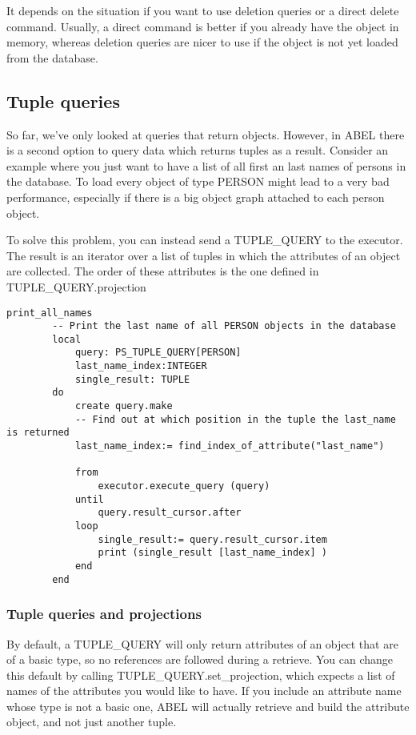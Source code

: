 It depends on the situation if you want to use deletion queries or a direct delete command. 
Usually, a direct command is better if you already have the object in memory, whereas deletion queries are nicer to use if the object is not yet loaded from the database.

\subsection{Tuple queries}

So far, we've only looked at queries that return objects. However, in ABEL there is a second option to query data which returns tuples as a result.
Consider an example where you just want to have a list of all first an last names of persons in the database. 
To load every object of type PERSON might lead to a very bad performance, especially if there is a big object graph attached to each person object.

To solve this problem, you can instead send a TUPLE\_QUERY to the executor. 
The result is an iterator over a list of tuples in which the attributes of an object are collected. The order of these attributes is the one defined in TUPLE\_QUERY.projection

\begin{lstlisting}[language=OOSC2Eiffel, captionpos=b, caption={}, label={lst:tuple_query_simple}]
	print_all_names
		-- Print the last name of all PERSON objects in the database
		local
			query: PS_TUPLE_QUERY[PERSON]
			last_name_index:INTEGER
			single_result: TUPLE
		do
			create query.make
			-- Find out at which position in the tuple the last_name is returned
			last_name_index:= find_index_of_attribute("last_name")

			from
				executor.execute_query (query)
			until
				query.result_cursor.after
			loop
				single_result:= query.result_cursor.item
				print (single_result [last_name_index] )
			end			
		end
\end{lstlisting}

\subsubsection{Tuple queries and projections}
By default, a TUPLE\_QUERY will only return attributes of an object that are of a basic type, so no references are followed during a retrieve.
You can change this default by calling TUPLE\_QUERY.set\_projection, which expects a list of names of the attributes you would like to have.
If you include an attribute name whose type is not a basic one, ABEL will actually retrieve and build the attribute object, and not just another tuple.

